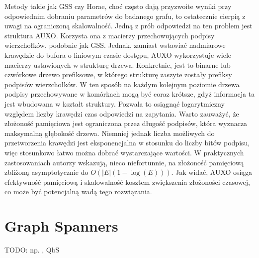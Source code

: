     Metody takie jak GSS czy Horae, choć często dają przyzwoite wyniki przy odpowiednim dobraniu parametrów do badanego grafu, to ostatecznie cierpią z uwagi na ograniczoną skalowalność. Jedną z prób odpowiedzi na ten problem jest struktura AUXO\cite{Jiang_Chen_Jin_2023}. Korzysta ona z macierzy przechowujących podpisy wierzchołków, podobnie jak GSS. Jednak, zamiast wstawiać nadmiarowe krawędzie do bufora o liniowym czasie dostępu, AUXO wykorzystuje wiele macierzy ustawionych w strukturę drzewa. Konkretnie, jest to binarne lub czwórkowe drzewo prefiksowe, w którego strukturę zaszyte zostały prefiksy podpisów wierzchołków. W ten sposób na każdym kolejnym poziomie drzewa podpisy przechowywane w komórkach mogą być coraz krótsze, gdyż informacja ta jest wbudowana w kształt struktury. Pozwala to osiągnąć logarytmiczny względem liczby krawędzi czas odpowiedzi na zapytania. Warto zauważyć, że złożoność pamięciowa jest ograniczona przez długość podpisów, która wyznacza maksymalną głębokość drzewa. Niemniej jednak liczba możliwych do przetworzenia krawędzi jest eksponencjalna w stosunku do liczby bitów podpisu, więc stosunkowo łatwo można dobrać wystarczające wartości. W praktycznych zastosowaniach autorzy wskazują, nieco niefortunnie, na złożoność pamięciową zbliżoną asymptotycznie do $O(|E|(1 - \log(E)))$. Jak widać, AUXO osiąga efektywność pamięciową i skalowalność kosztem zwiększenia złożoności czasowej, co może być potencjalną wadą tego rozwiązania.

\section{Graph Spanners}
    TODO: np. \cite{Elkin_Trehan_2022}, QbS \cite{Wang_Wang_Koehler_Lin_2021}

